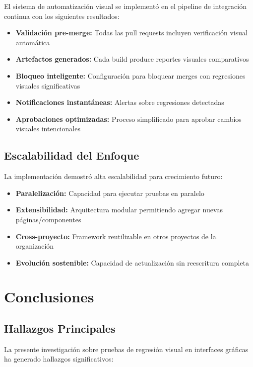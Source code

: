 \documentclass{article}
\begin{document}
El sistema de automatización visual se implementó en el pipeline de integración continua con los siguientes resultados:

\begin{itemize}[nosep]
\item \textbf{Validación pre-merge:} Todas las pull requests incluyen verificación visual automática
\item \textbf{Artefactos generados:} Cada build produce reportes visuales comparativos
\item \textbf{Bloqueo inteligente:} Configuración para bloquear merges con regresiones visuales significativas
\item \textbf{Notificaciones instantáneas:} Alertas sobre regresiones detectadas
\item \textbf{Aprobaciones optimizadas:} Proceso simplificado para aprobar cambios visuales intencionales
\end{itemize}

\subsection{Escalabilidad del Enfoque}

La implementación demostró alta escalabilidad para crecimiento futuro:

\begin{itemize}[nosep]
\item \textbf{Paralelización:} Capacidad para ejecutar pruebas en paralelo
\item \textbf{Extensibilidad:} Arquitectura modular permitiendo agregar nuevas páginas/componentes
\item \textbf{Cross-proyecto:} Framework reutilizable en otros proyectos de la organización
\item \textbf{Evolución sostenible:} Capacidad de actualización sin reescritura completa
\end{itemize}

\section{Conclusiones}

\subsection{Hallazgos Principales}

La presente investigación sobre pruebas de regresión visual en interfaces gráficas ha generado hallazgos significativos:
\end{document}
